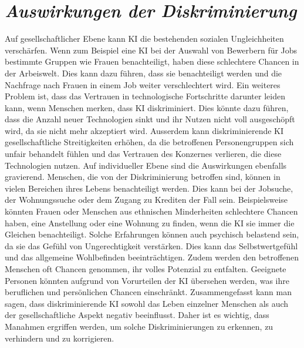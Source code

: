 \documentclass{article}
\begin{document}
\section{\textit{Auswirkungen der Diskriminierung}}
Auf gesellschaftlicher Ebene kann KI die bestehenden sozialen Ungleichheiten verschärfen. Wenn zum Beispiel eine KI bei der Auswahl von Bewerbern für Jobs bestimmte Gruppen wie Frauen benachteiligt, haben diese schlechtere Chancen in der Arbeiswelt. Dies kann dazu führen, dass sie benachteiligt werden und die Nachfrage nach Frauen in einem Job weiter verschlechtert wird. Ein weiteres Problem ist, dass das Vertrauen in technologische Fortschritte darunter leiden kann, wenn Menschen merken, dass KI diskriminiert. Dies könnte dazu führen, dass die Anzahl neuer Technologien sinkt und ihr Nutzen nicht voll ausgeschöpft wird, da sie nicht mehr akzeptiert wird. Ausserdem kann diskriminierende KI gesellschaftliche Streitigkeiten erhöhen, da die betroffenen Personengruppen sich unfair behandelt fühlen und das Vertrauen des Konzernes verlieren, die diese Technologien nutzen. Auf individueller Ebene sind die Auswirkungen ebenfalls gravierend. Menschen, die von der Diskriminierung betroffen sind, können in vielen Bereichen ihres Lebens benachteiligt werden. Dies kann bei der Jobsuche, der Wohnungssuche oder dem Zugang zu Krediten der Fall sein. Beispielsweise könnten Frauen oder Menschen aus ethnischen Minderheiten schlechtere Chancen haben, eine Anstellung oder eine Wohnung zu finden, wenn die KI sie immer die Gleichen benachteiligt. Solche Erfahrungen können auch psychisch belastend sein, da sie das Gefühl von Ungerechtigkeit verstärken. Dies kann das Selbstwertgefühl und das allgemeine Wohlbefinden beeinträchtigen. Zudem werden den betroffenen Menschen oft Chancen genommen, ihr volles Potenzial zu entfalten. Geeignete Personen könnten aufgrund von Vorurteilen der KI übersehen werden, was ihre beruflichen und persönlichen Chancen einschränkt. Zusammengefasst kann man sagen, dass diskriminierende KI sowohl das Leben einzelner Menschen als auch der gesellschaftliche Aspekt negativ beeinflusst. Daher ist es wichtig, dass Manahmen ergriffen werden, um solche Diskriminierungen zu erkennen, zu verhindern und zu korrigieren. 
\end{document}
